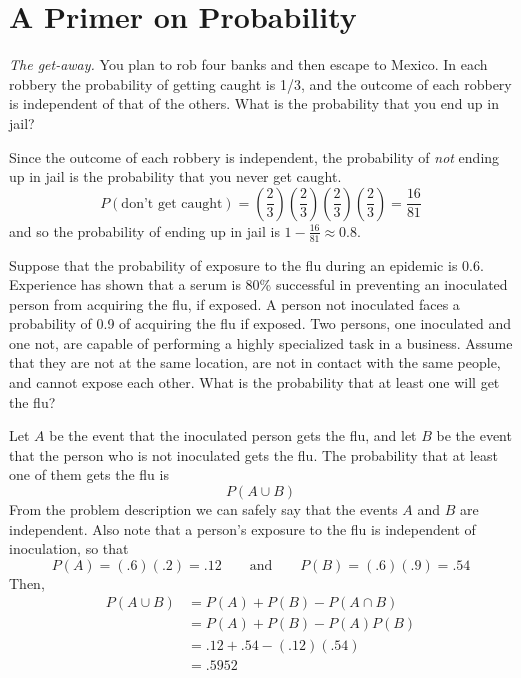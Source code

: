 \appendix

\chapter{A Primer on Probability}


\emph{The get-away.} You plan to rob four banks and then escape
  to Mexico. In each robbery the probability of getting caught is 1/3,
  and the outcome of each robbery is independent of that of the
  others. What is the probability that you end up in jail?

  Since the outcome of each robbery is independent, the probability of
  \emph{not} ending up in jail is the probability that you never get
  caught.
\[
P(\text{don't get caught}) = 
\left(\frac{2}{3}\right)\left(\frac{2}{3}\right)\left(\frac{2}{3}\right)\left(\frac{2}{3}\right) = 
\frac{16}{81}
\]
and so the probability of ending up in jail is $1 - \frac{16}{81} \approx 0.8$.

Suppose that the probability of exposure to the flu during an epidemic
is 0.6. Experience has shown that a serum is 80\% successful in
preventing an inoculated person from acquiring the flu, if exposed. A
person not inoculated faces a probability of 0.9 of acquiring the flu
if exposed. Two persons, one inoculated and one not, are capable of
performing a highly specialized task in a business.  Assume that they
are not at the same location, are not in contact with the same people,
and cannot expose each other. What is the probability that at least
one will get the flu?

Let $A$ be the event that the inoculated person gets the flu, and let $B$
be the event that the person who is not inoculated gets the flu. The probability
that at least one of them gets the flu is
\[ P(A \cup B) \]
From the problem description we can safely say
that the events $A$ and $B$ are independent. Also note that a
person's exposure to the flu is independent of inoculation, so that
\[ P(A) = (.6)(.2) = .12 \qquad \text{and} \qquad P(B) = (.6)(.9) = .54 \]
Then,
\begin{align*}
  P(A \cup B) &= P(A) + P(B) - P(A \cap B)\\
              &= P(A) + P(B) - P(A)P(B)\\
              &= .12 + .54 - (.12)(.54)\\
              &= .5952
\end{align*}

